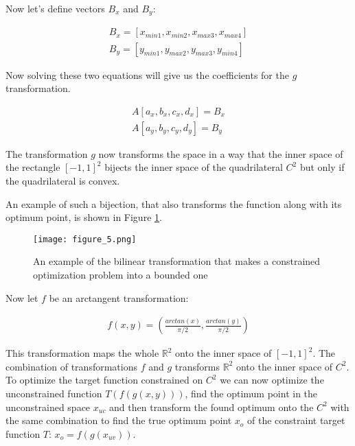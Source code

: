 \documentclass[
	a4paper, %
	10pt, %
	unnumberedsections, %
	twoside, %
]{LTJournalArticle}
\begin{document}
Now let's define vectors $B_x$ and $B_y$:

\begin{equation}
	\begin{array}{cc}
	B_x = [x_{min1}, x_{min2}, x_{max3}, x_{max4}] \\
	B_y = [y_{min1}, y_{max2}, y_{max3}, y_{min4}]
	\end{array}
	\label{eq:corners_vectors}
\end{equation}

Now solving these two equations will give us the coefficients for the $g$ transformation.

\begin{equation}
	\begin{array}{cc}
	A [a_x, b_x, c_x, d_x] = B_x \\
	A [a_y, b_y, c_y, d_y] = B_y
	\end{array}
	\label{eq:corners_equations}
\end{equation}

The transformation $g$ now transforms the space in a way that the inner space of the rectangle $[-1, 1]^2$ bijects the inner space of the quadrilateral $C^2$ but only if the quadrilateral is convex.

An example of such a bijection, that also transforms the function along with its optimum point, is shown in Figure \ref{fig:bilinear}.

\begin{figure} 
	\texttt{[image: figure\_5.png]}
	\caption{An example of the bilinear transformation that makes a constrained optimization problem into a bounded one}
	\label{fig:bilinear}
\end{figure}

Now let $f$ be an arctangent transformation:

\begin{equation}
	\begin{split}
	f(x, y) = (\frac{arctan(x)}{\pi / 2}, \frac{arctan(y)}{\pi / 2})
	\end{split}
	\label{eq:arctangent_transformation}
\end{equation}

This transformation maps the whole $\mathbb{R}^2$ onto the inner space of $[-1, 1]^2$. The combination of transformations $f$ and $g$ transforms $\mathbb{R}^2$ onto the inner space of $C^2$. To optimize the target function constrained on $C^2$ we can now optimize the unconstrained function $T(f(g(x, y)))$, find the optimum point in the unconstrained space $x_{uc}$ and then transform the found optimum onto the $C^2$ with the same combination to find the true optimum point $x_o$ of the constraint target function $T$: $x_o = f(g(x_{uv}))$.
\end{document}
